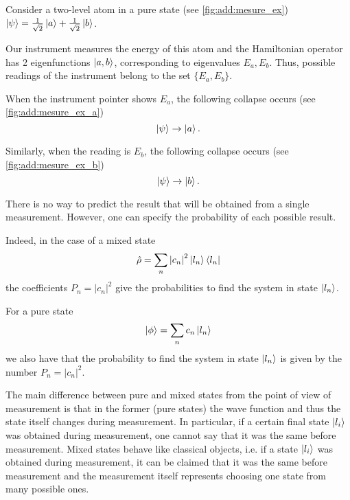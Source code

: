 \begin{example}
Consider a two-level atom in a pure state
(see \autoref{fig:add:mesure_ex}) 
\(
\left|\psi\right> = \frac{1}{\sqrt{2}}\ket{a}
+ \frac{1}{\sqrt{2}}\ket{b}
\).



Our instrument measures the energy of this atom and the Hamiltonian operator has 2 eigenfunctions $\ket{a,b}$, corresponding to eigenvalues $E_a, E_b$. Thus, possible
readings of the instrument belong to the set $\{E_a, E_b\}$. 



When the instrument pointer shows $E_a$, the following collapse occurs  (see \autoref{fig:add:mesure_ex_a})
\[
\left|\psi\right> \to \ket{a}.
\]



Similarly, when the reading is $E_b$, the following collapse occurs  (see \autoref{fig:add:mesure_ex_b})
\[
\left|\psi\right> \to \ket{b}.
\]
\end{example}

There is no way to predict the result that will be obtained from a single measurement. However,
one can specify the probability of each possible result.

Indeed, in the case of a mixed state
\begin{equation}
\hat{\rho} = 
\sum_n \left|c_n\right|^2 \ket{l_n}\bra{l_n}
\nonumber
\end{equation}
the coefficients $P_n = \left|c_n\right|^2$
give the probabilities to find the system in state $\ket{l_n}$. 

For a pure state
\begin{equation}
\left| \phi \right> = 
\sum_n c_n \ket{l_n}
\nonumber
\end{equation}
we also have that the probability to find the system in state
$\ket{l_n}$ is given by the number $P_n = \left|c_n\right|^2$. 

The main difference between pure and mixed states from the point of view of measurement
is that in the former (pure states) the wave function and thus the state itself changes during
measurement. In particular,
if a certain final state $\ket{l_i}$ was obtained during measurement, one cannot say that it was the same before
measurement. Mixed states 
behave like classical objects,
i.e. if a state $\ket{l_i}$ was obtained during measurement, it can be claimed that it was the same before
measurement and the measurement itself represents choosing
one state from many possible ones.

